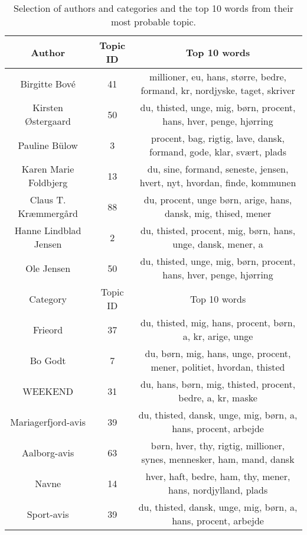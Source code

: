 \begin{table*}[h]
	\centering
	\caption{Selection of authors and categories and the top 10 words from their most probable topic.}
	\begin{tabular}{c|c|c}
		\toprule
		Author & Topic ID & Top 10 words\\
		\midrule
		Birgitte Bové & 41 & millioner, eu, hans, større, bedre, formand, kr, nordjyske, taget, skriver \\
		Kirsten Østergaard & 50 & du, thisted, unge, mig, børn, procent, hans, hver, penge, hjørring \\
		Pauline Bülow & 3 & procent, bag, rigtig, lave, dansk, formand, gode, klar, svært, plads \\
		Karen Marie Foldbjerg & 13 & du, sine, formand, seneste, jensen, hvert, nyt, hvordan, finde, kommunen \\
		Claus T. Kræmmergård & 88 & du, procent, unge børn, arige, hans, dansk, mig, thised, mener \\
		Hanne Lindblad Jensen & 2 & du, thisted, procent, mig, børn, hans, unge, dansk, mener, a \\
		Ole Jensen & 50 & du, thisted, unge, mig, børn, procent, hans, hver, penge, hjørring \\
		\midrule
		Category & Topic ID & Top 10 words \\
		\midrule
		Frieord & 37 & du, thisted, mig, hans, procent, børn, a, kr, arige, unge \\
		Bo Godt & 7 & du, børn, mig, hans, unge, procent, mener, politiet, hvordan, thisted \\
		WEEKEND & 31 & du, hans, børn, mig, thisted, procent, bedre, a, kr, maske \\
		Mariagerfjord-avis & 39 & du, thisted, dansk, unge, mig, børn, a, hans, procent, arbejde \\
		Aalborg-avis & 63 & børn, hver, thy, rigtig, millioner, synes, mennesker, ham, mand, dansk \\
		Navne & 14 & hver, haft, bedre, ham, thy, mener, hans, nordjylland, plads \\
		Sport-avis & 39 & du, thisted, dansk, unge, mig, børn, a, hans, procent, arbejde \\
		\bottomrule
	\end{tabular}
	\label{tab:author_top_words}
\end{table*}
